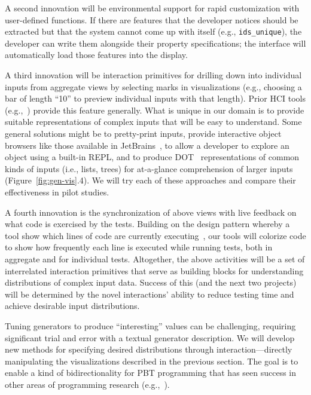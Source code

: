{A second innovation will be environmental support for rapid customization with
user-defined functions.  If
there are features that the developer notices should be extracted but that the
system cannot come up with itself (e.g., \lstinline{ids_unique}), the developer
can
write them alongside their property specifications;
the interface will automatically load those features into the
display.

A third innovation will be interaction primitives for drilling down into
individual inputs from aggregate views by selecting marks in visualizations
(e.g., choosing a bar
of length ``10'' to preview individual inputs with that length). Prior HCI tools
(e.g.,~\cite{ref:hohman2019gamut})
provide this feature generally. What is unique in our domain is to provide
suitable representations of complex inputs that
will be easy to understand. Some general solutions might be to
pretty-print inputs, provide interactive object browsers like those available
in JetBrains~\cite{tool:jetbrains}, to allow a developer to explore an
object using a built-in REPL, and to produce
DOT~\cite{ellson_graphviz_2002} representations of common kinds of
inputs (i.e., lists, trees) for at-a-glance comprehension of
larger inputs (Figure~\ref{fig:gen-vis}.4). We will try each of these
approaches and compare their effectiveness in pilot studies.

A fourth innovation is the synchronization of above views with
live feedback on what code is exercised by the tests. Building on the design
pattern whereby a tool show which lines of code are currently
executing~\cite{ref:brandt2010rehearse,
  ref:oney2009firecrystal, ref:burg2013record}, our tools will
colorize code to show
how frequently each line is executed while running tests, both in aggregate and
for individual tests. Altogether, the above activities will be a set of
interrelated interaction primitives that serve as building blocks for
understanding distributions of complex input data. Success of this (and the next
two projects) will be determined by the novel interactions' ability to reduce
testing time and achieve desirable input distributions.

%
Tuning generators to produce ``interesting''
values can be challenging, requiring
significant trial and error with a textual generator description.
We will develop new methods for specifying desired distributions
through interaction---directly manipulating the visualizations
described in the previous section. The goal is to enable a kind of
bidirectionality for PBT programming that has seen success in other areas of
programming research (e.g.,~\cite{ref:hempel2019sketch, ref:kery2020mage,
  ref:omar2012active, ref:omar2021filling}).

}
